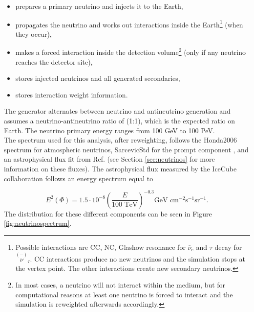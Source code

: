 \newcommand\barparen[1]{\overset{(-)}{#1}}
\vspace{2mm}
\begin{itemize}
\item prepares a primary neutrino and injects it to the Earth,
\item propagates the neutrino and works out interactions inside the Earth\footnote{Possible interactions are CC, NC, Glashow resonance for $\bar{\nu}_e$ and $\tau$ decay for $\barparen{\nu}_\tau$. CC interactions produce no new neutrinos and the simulation stops at the vertex point. The other interactions create new secondary neutrinos.} (when they occur),
\item makes a forced interaction inside the detection volume\footnote{In most cases, a neutrino will not interact within the medium, but for computational reasons at least one neutrino is forced to interact and the simulation is reweighted afterwards accordingly.} (only if any neutrino reaches the detector site),
\item stores injected neutrinos and all generated secondaries,
\item stores interaction weight information.
\end{itemize}
\vspace{3mm}
\noindent The generator alternates between neutrino and antineutrino generation and assumes a neutrino-antineutrino ratio of (1:1), which is the expected ratio on Earth. The neutrino primary energy ranges from 100 GeV to 100 PeV.\\

\noindent The spectrum used for this analysis, after reweighting, follows the Honda2006 spectrum \cite{Honda:2006qj} for atmospheric neutrinos, SarcevicStd for the prompt component \cite{Enberg:2008te}, and an astrophysical flux fit from Ref. \cite{Aartsen:2014gkd} (see Section \ref{sec:neutrinos} for more information on these fluxes). The astrophysical flux measured by the IceCube collaboration follows an energy spectrum equal to

\begin{equation}
E^2 \left(\Phi \right) = 1.5 \cdot 10^{-8} \left( \frac{E}{100 \textrm{ TeV}} \right)^{-0.3} \textrm{GeV } \textrm{cm}^{-2} \textrm{s}^{-1} \textrm{sr}^{-1}.
\end{equation}
\vspace{3mm}
\noindent The distribution for these different components can be seen in Figure \ref{fig:neutrinospectrum}.

